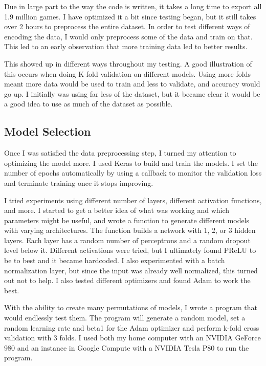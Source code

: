 \documentclass[twoside,twocolumn]{article}
\begin{document}
Due in large part to the way the code is written, it takes a long time to export all 1.9 million games.  I have optimized it a bit since testing began, but it still takes over 2 hours to preprocess the entire dataset.  In order to test different ways of encoding the data, I would only preprocess some of the data and train on that.  This led to an early observation that more training data led to better results.

This showed up in different ways throughout my testing.  A good illustration of this occurs when doing K-fold validation on different models.  Using more folds meant more data would be used to train and less to validate, and accuracy would go up.  I initially was using far less of the dataset, but it became clear it would be a good idea to use as much of the dataset as possible.

\subsection{Model Selection}

Once I was satisfied the data preprocessing step, I turned my attention to optimizing the model more.  I used Keras to build and train the models.  I set the number of epochs automatically by using a callback to monitor the validation loss and terminate training once it stops improving.

I tried experiments using different number of layers, different activation functions, and more.  I started to get a better idea of what was working and which parameters might be useful, and wrote a function to generate different models with varying architectures.  The function builds a network with 1, 2, or 3 hidden layers.  Each layer has a random number of perceptrons and a random dropout level below it.  Different activations were tried, but I ultimately found PReLU to be to best and it became hardcoded.  I also experimented with a batch normalization layer, but since the input was already well normalized, this turned out not to help.  I also tested different optimizers and found Adam to work the best.

With the ability to create many permutations of models, I wrote a program that would endlessly test them.  The program will generate a random model, set a random learning rate and beta1 for the Adam optimizer and perform k-fold cross validation with 3 folds.  I used both my home computer with an NVIDIA GeForce 980 and an instance in Google Compute with a NVIDIA Tesla P80 to run the program.
\end{document}
